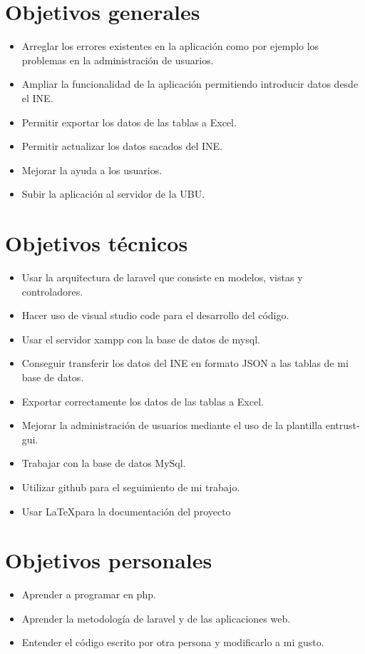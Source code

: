 \section{Objetivos generales}
\begin{itemize}
	\item Arreglar los errores existentes en la aplicación como por ejemplo los problemas en la administración de usuarios. 
	\item Ampliar la funcionalidad de la aplicación permitiendo introducir datos desde el INE.
	\item Permitir exportar los datos de las tablas a Excel.
	\item Permitir actualizar los datos sacados del INE.
	\item Mejorar la ayuda a los usuarios.
	\item Subir la aplicación al servidor de la UBU.
\end{itemize}
\section{Objetivos técnicos}
\begin{itemize}
	\item Usar la arquitectura de laravel que consiste en modelos, vistas y controladores.
	\item Hacer uso de visual studio code para el desarrollo del código.
	\item Usar el servidor xampp con la base de datos de mysql.
	\item Conseguir transferir los datos del INE en formato JSON a las tablas de mi base de datos.
	\item Exportar correctamente los datos de las tablas a Excel.
	\item Mejorar la administración de usuarios mediante el uso de la plantilla entrust-gui.
	\item Trabajar con la base de datos MySql.
	\item Utilizar github para el seguimiento de mi trabajo.
	\item Usar \LaTeX para la documentación del proyecto
\end{itemize}
\section{Objetivos personales}
\begin{itemize}
	\item Aprender a programar en php.
	\item Aprender la metodología de laravel y de las aplicaciones web.
	\item Entender el código escrito por otra persona y modificarlo a mi gusto.
\end{itemize}